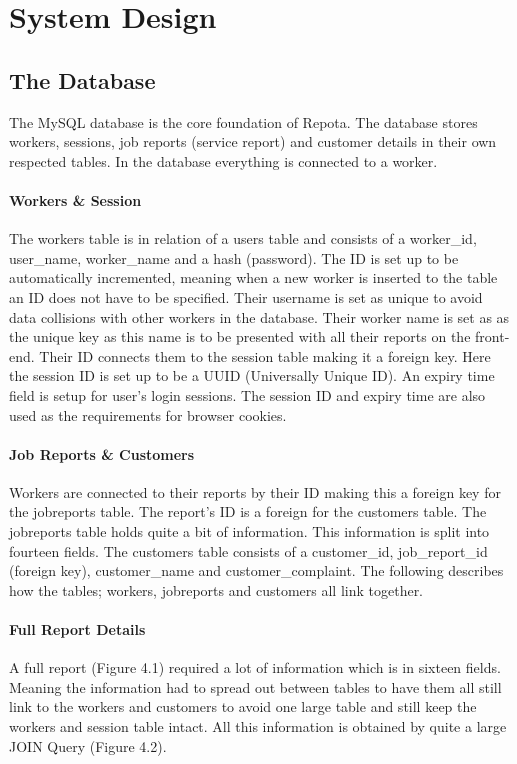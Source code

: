 \chapter{System Design}
\section{The Database}
The MySQL database is the core foundation of Repota. The database stores workers, sessions, job reports (service report) and customer details in their own respected tables. In the database everything is connected to a worker. 

\subsubsection{Workers \& Session}
The workers table is in relation of a users table and consists of a worker\_id, user\_name, worker\_name and a hash (password). The ID is set up to be automatically incremented, meaning when a new worker is inserted to the table an ID does not have to be specified. Their username is set as unique to avoid data collisions with other workers in the database. Their worker name is set as as the unique key as this name is to be presented with all their reports on the front-end. Their ID connects them to the session table making it a foreign key. Here the session ID is set up to be a UUID (Universally Unique ID). An expiry time field is setup for user's login sessions. The session ID and expiry time are also used as the requirements for browser cookies.

\subsubsection{Job Reports \& Customers}
Workers are connected to their reports by their ID making this a foreign key for the jobreports table. The report's ID is a foreign for the customers table. The jobreports table holds quite a bit of information. This information is split into fourteen fields. The customers table consists of a customer\_id, job\_report\_id (foreign key), customer\_name and customer\_complaint.  The following describes how the tables; workers, jobreports and customers all link together. 
\newpage
\subsubsection{Full Report Details}
A full report (Figure 4.1) required a lot of information which is in sixteen fields. Meaning the information had to spread out between tables to have them all still link to the workers and customers to avoid one large table and still keep the workers and session table intact. All this information is obtained by quite a large JOIN Query (Figure 4.2).


